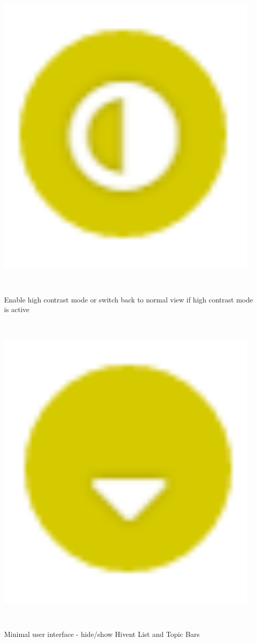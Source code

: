 \begin{minipage}{0.05\textwidth}
	\includegraphics[width=0.95\textwidth]{graphics/HC.png}
\end{minipage}
\label{fig:controll_button_HC}
~
\begin{minipage}{0.94\textwidth}
	Enable high contrast mode or switch back to normal view if high contrast mode is active\\
\end{minipage}
~
\begin{minipage}{0.05\textwidth}
	\includegraphics[width=0.95\textwidth]{graphics/minUi.png}
\end{minipage}
\label{fig:controll_button_HC_2}
~
\begin{minipage}{0.94\textwidth}
	Minimal user interface - hide/show Hivent List and Topic Bars
\end{minipage}
~
